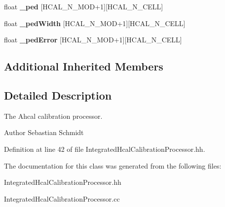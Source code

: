 \begin{DoxyCompactItemize}
\item 
float {\bfseries \-\_\-ped} [H\-C\-A\-L\-\_\-\-N\-\_\-\-M\-O\-D+1][H\-C\-A\-L\-\_\-\-N\-\_\-\-C\-E\-L\-L]\label{classCALICE_1_1IntegratedHcalCalibrationProcessor_a15da76dd2514ace90b34ec890ee49f3a}

\item 
float {\bfseries \-\_\-ped\-Width} [H\-C\-A\-L\-\_\-\-N\-\_\-\-M\-O\-D+1][H\-C\-A\-L\-\_\-\-N\-\_\-\-C\-E\-L\-L]\label{classCALICE_1_1IntegratedHcalCalibrationProcessor_aaf5121c45f2bd9af321b74d6247186fa}

\item 
float {\bfseries \-\_\-ped\-Error} [H\-C\-A\-L\-\_\-\-N\-\_\-\-M\-O\-D+1][H\-C\-A\-L\-\_\-\-N\-\_\-\-C\-E\-L\-L]\label{classCALICE_1_1IntegratedHcalCalibrationProcessor_aa0fd128f60f5a4b034660f0ed4c5428c}

\end{DoxyCompactItemize}
\subsection*{Additional Inherited Members}


\subsection{Detailed Description}
The Ahcal calibration processor. 

\begin{DoxyAuthor}{Author}
Sebastian Schmidt 
\end{DoxyAuthor}


Definition at line 42 of file Integrated\-Hcal\-Calibration\-Processor.\-hh.



The documentation for this class was generated from the following files\-:\begin{DoxyCompactItemize}
\item 
Integrated\-Hcal\-Calibration\-Processor.\-hh\item 
Integrated\-Hcal\-Calibration\-Processor.\-cc\end{DoxyCompactItemize}
